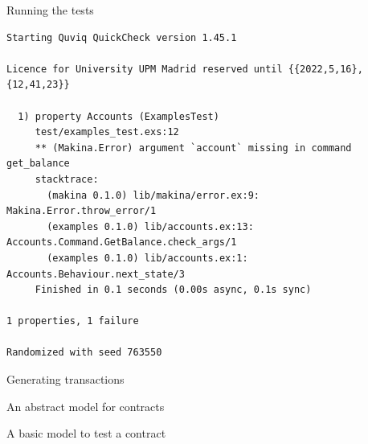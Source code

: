 \documentclass[aspectratio=169, 10pt]{beamer}
\begin{document}
\begin{frame}[label={sec:org0121bac},fragile]{Running the tests}
 \lstset{language=shell,label= ,caption= ,captionpos=b,numbers=none,style=display}
\begin{lstlisting}
Starting Quviq QuickCheck version 1.45.1

Licence for University UPM Madrid reserved until {{2022,5,16},{12,41,23}}

  1) property Accounts (ExamplesTest)
     test/examples_test.exs:12
     ** (Makina.Error) argument `account` missing in command get_balance
     stacktrace:
       (makina 0.1.0) lib/makina/error.ex:9: Makina.Error.throw_error/1
       (examples 0.1.0) lib/accounts.ex:13: Accounts.Command.GetBalance.check_args/1
       (examples 0.1.0) lib/accounts.ex:1: Accounts.Behaviour.next_state/3
     Finished in 0.1 seconds (0.00s async, 0.1s sync)

1 properties, 1 failure

Randomized with seed 763550
\end{lstlisting}
\end{frame}

\begin{frame}[label={sec:org9985359}]{Generating transactions}
\end{frame}

\begin{frame}[label={sec:org87c7b6c}]{An abstract model for contracts}
\end{frame}

\begin{frame}[label={sec:orgcd540f2}]{A basic model to test a contract}
\end{frame}
\end{document}
